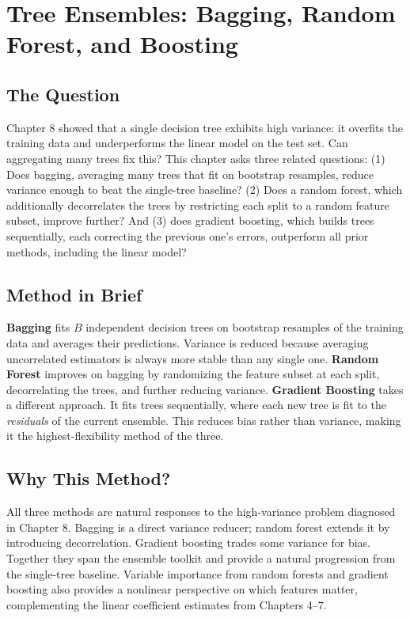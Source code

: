 \documentclass[12pt, oneside]{book}
\begin{document}
\chapter{Tree Ensembles: Bagging, Random Forest, and Boosting}
 
\section{The Question}
 
Chapter 8 showed that a single decision tree exhibits high variance: it overfits the training data and underperforms the linear model on the test set. Can aggregating many trees fix this? This chapter asks three related questions: (1) Does bagging, averaging many trees that fit on bootstrap resamples, reduce variance enough to beat the single-tree baseline? (2) Does a random forest, which additionally decorrelates the trees by restricting each split to a random feature subset, improve further? And (3) does gradient boosting, which builds trees sequentially, each correcting the previous one's errors, outperform all prior methods, including the linear model?
 
\section{Method in Brief}
 
\textbf{Bagging} fits $B$ independent decision trees on bootstrap resamples of the training data and averages their predictions. Variance is reduced because averaging uncorrelated estimators is always more stable than any single one. \textbf{Random Forest} improves on bagging by randomizing the feature subset at each split, decorrelating the trees, and further reducing variance. \textbf{Gradient Boosting} takes a different approach. It fits trees sequentially, where each new tree is fit to the \textit{residuals} of the current ensemble. This reduces bias rather than variance, making it the highest-flexibility method of the three.
 
\section{Why This Method?}
 
All three methods are natural responses to the high-variance problem diagnosed in Chapter 8. Bagging is a direct variance reducer; random forest extends it by introducing decorrelation. Gradient boosting trades some variance for bias. Together they span the ensemble toolkit and provide a natural progression from the single-tree baseline. Variable importance from random forests and gradient boosting also provides a nonlinear perspective on which features matter, complementing the linear coefficient estimates from Chapters 4--7.
 
\end{document}
